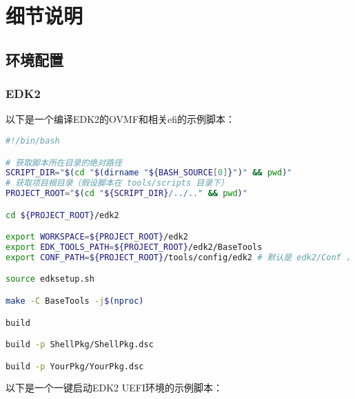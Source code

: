 \chapter{细节说明}
\section{环境配置}
\subsection{EDK2}\label{appendix:launchuefi}
以下是一个编译EDK2的OVMF和相关efi的示例脚本：
\begin{lstlisting}[language=bash]
#!/bin/bash

# 获取脚本所在目录的绝对路径
SCRIPT_DIR="$(cd "$(dirname "${BASH_SOURCE[0]}")" && pwd)"
# 获取项目根目录（假设脚本在 tools/scripts 目录下）
PROJECT_ROOT="$(cd "${SCRIPT_DIR}/../.." && pwd)"

cd ${PROJECT_ROOT}/edk2

export WORKSPACE=${PROJECT_ROOT}/edk2
export EDK_TOOLS_PATH=${PROJECT_ROOT}/edk2/BaseTools
export CONF_PATH=${PROJECT_ROOT}/tools/config/edk2 # 默认是 edk2/Conf ，为了优雅这里把它单独提出来

source edksetup.sh

make -C BaseTools -j$(nproc)

build

build -p ShellPkg/ShellPkg.dsc

build -p YourPkg/YourPkg.dsc

\end{lstlisting}
以下是一个一键启动EDK2 UEFI环境的示例脚本：
